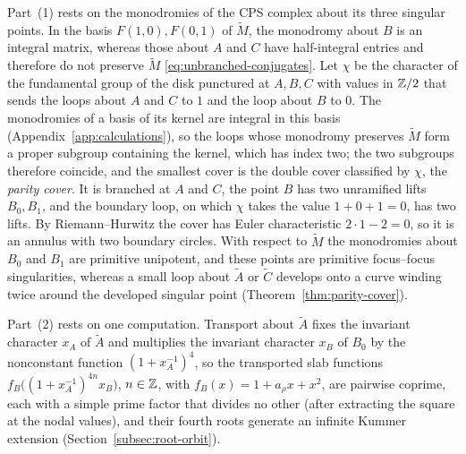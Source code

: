 Part~(1) rests on the monodromies of the CPS complex about its three
singular points.  In the basis $F(1,0),F(0,1)$ of $\widetilde M$, the
monodromy about $B$ is an integral matrix, whereas those about $A$ and $C$
have half-integral entries and therefore do not preserve $\widetilde M$
\eqref{eq:unbranched-conjugates}.  Let $\chi$ be the character of the
fundamental group of the disk punctured at $A,B,C$ with values in $\mathbb Z/2$
that sends the loops about $A$ and $C$ to $1$ and the loop about $B$ to $0$.
The monodromies of a basis of its kernel are integral in this basis
(Appendix~\ref{app:calculations}), so the loops whose monodromy preserves
$\widetilde M$ form a proper subgroup containing the kernel, which has index
two; the two subgroups therefore coincide, and the smallest cover is the
double cover classified by $\chi$, the \emph{parity cover}.  It is branched
at $A$ and $C$, the point $B$ has two unramified lifts $B_0,B_1$, and the
boundary loop, on which $\chi$ takes the value $1+0+1=0$, has two lifts.  By Riemann--Hurwitz the
cover has Euler characteristic $2\cdot1-2=0$, so it is an annulus with two
boundary circles.  With respect to $\widetilde M$ the monodromies about
$B_0$ and $B_1$ are primitive unipotent, and these points are primitive
focus--focus singularities, whereas a small loop about $\widetilde A$ or
$\widetilde C$ develops onto a curve winding twice around the developed
singular point (Theorem~\ref{thm:parity-cover}).

Part~(2) rests on one computation.  Transport about $\widetilde A$ fixes the
invariant character $x_A$ of $\widetilde A$ and multiplies the invariant
character $x_B$ of $B_0$ by the nonconstant function $(1+x_A^{-1})^4$, so
the transported slab functions $f_B\bigl((1+x_A^{-1})^{4n}x_B\bigr)$,
$n\in\mathbb Z$, with $f_B(x)=1+a_\rho x+x^2$, are pairwise coprime, each with a
simple prime factor that divides no other (after extracting the square at
the nodal values), and their fourth roots generate an infinite Kummer
extension (Section~\ref{subsec:root-orbit}).

